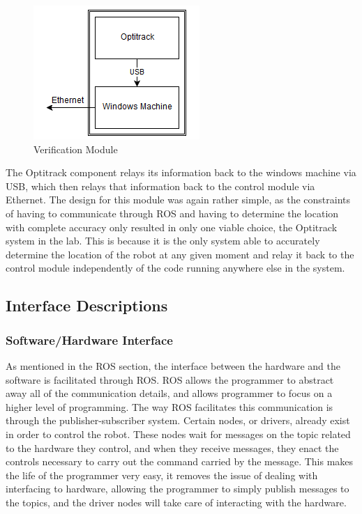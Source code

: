 \documentclass{article}
\newcommand\tab[1][0.5cm]{\hspace*{#1}}
\newcounter{subsubsubsection}[subsubsection]
\begin{document}
\begin{figure}[h!]
\centering
\includegraphics[scale=0.70]{verify_module.PNG}
\caption{Verification Module}
\label{fig:ver_mod}
\end{figure}

The Optitrack component relays its information back to the windows machine via USB, which then relays that information back to the control module via Ethernet.
\tab The design for this module was again rather simple, as the constraints of having to communicate through ROS and having to determine the location with complete accuracy only resulted in only one viable choice, the Optitrack system in the lab. This is because it is the only system able to accurately determine the location of the robot at any given moment and relay it back to the control module independently of the code running anywhere else in the system.

\subsection{Interface Descriptions}
\subsubsection{Software/Hardware Interface}
\tab As mentioned in the ROS section, the interface between the hardware and the software is facilitated through ROS. ROS allows the programmer to abstract away all of the communication details, and allows programmer to focus on a higher level of programming. The way ROS facilitates this communication is through the publisher-subscriber system. Certain nodes, or drivers, already exist in order to control the robot. These nodes wait for messages on the topic related to the hardware they control, and when they receive messages, they enact the controls necessary to carry out the command carried by the message. This makes the life of the programmer very easy, it removes the issue of dealing with interfacing to hardware, allowing the programmer to simply publish messages to the topics, and the driver nodes will take care of interacting with the hardware.
\end{document}
